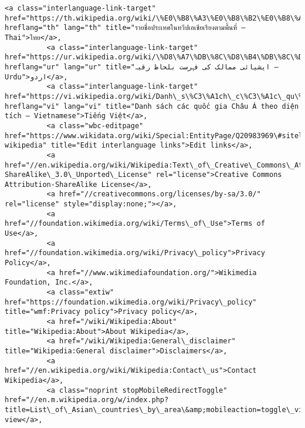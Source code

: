 \documentclass[11pt]{article}
\begin{document}
\begin{Verbatim}[commandchars=\\\{\}]
          <a class="interlanguage-link-target" href="https://th.wikipedia.org/wiki/\%E0\%B8\%A3\%E0\%B8\%B2\%E0\%B8\%A2\%E0\%B8\%8A\%E0\%B8\%B7\%E0\%B9\%88\%E0\%B8\%AD\%E0\%B8\%9B\%E0\%B8\%A3\%E0\%B8\%B0\%E0\%B9\%80\%E0\%B8\%97\%E0\%B8\%A8\%E0\%B9\%83\%E0\%B8\%99\%E0\%B8\%97\%E0\%B8\%A7\%E0\%B8\%B5\%E0\%B8\%9B\%E0\%B9\%80\%E0\%B8\%AD\%E0\%B9\%80\%E0\%B8\%8A\%E0\%B8\%B5\%E0\%B8\%A2\%E0\%B9\%80\%E0\%B8\%A3\%E0\%B8\%B5\%E0\%B8\%A2\%E0\%B8\%87\%E0\%B8\%95\%E0\%B8\%B2\%E0\%B8\%A1\%E0\%B8\%9E\%E0\%B8\%B7\%E0\%B9\%89\%E0\%B8\%99\%E0\%B8\%97\%E0\%B8\%B5\%E0\%B9\%88" hreflang="th" lang="th" title="รายชื่อประเทศในทวีปเอเชียเรียงตามพื้นที่ – Thai">ไทย</a>,
          <a class="interlanguage-link-target" href="https://ur.wikipedia.org/wiki/\%D8\%A7\%DB\%8C\%D8\%B4\%DB\%8C\%D8\%A7\%D8\%A6\%DB\%8C\_\%D9\%85\%D9\%85\%D8\%A7\%D9\%84\%DA\%A9\_\%DA\%A9\%DB\%8C\_\%D9\%81\%DB\%81\%D8\%B1\%D8\%B3\%D8\%AA\_\%D8\%A8\%D9\%84\%D8\%AD\%D8\%A7\%D8\%B8\_\%D8\%B1\%D9\%82\%D8\%A8\%DB\%81" hreflang="ur" lang="ur" title="ایشیائی ممالک کی فہرست بلحاظ رقبہ – Urdu">اردو</a>,
          <a class="interlanguage-link-target" href="https://vi.wikipedia.org/wiki/Danh\_s\%C3\%A1ch\_c\%C3\%A1c\_qu\%E1\%BB\%91c\_gia\_Ch\%C3\%A2u\_\%C3\%81\_theo\_di\%E1\%BB\%87n\_t\%C3\%ADch" hreflang="vi" lang="vi" title="Danh sách các quốc gia Châu Á theo diện tích – Vietnamese">Tiếng Việt</a>,
          <a class="wbc-editpage" href="https://www.wikidata.org/wiki/Special:EntityPage/Q20983969\#sitelinks-wikipedia" title="Edit interlanguage links">Edit links</a>,
          <a href="//en.wikipedia.org/wiki/Wikipedia:Text\_of\_Creative\_Commons\_Attribution-ShareAlike\_3.0\_Unported\_License" rel="license">Creative Commons Attribution-ShareAlike License</a>,
          <a href="//creativecommons.org/licenses/by-sa/3.0/" rel="license" style="display:none;"></a>,
          <a href="//foundation.wikimedia.org/wiki/Terms\_of\_Use">Terms of Use</a>,
          <a href="//foundation.wikimedia.org/wiki/Privacy\_policy">Privacy Policy</a>,
          <a href="//www.wikimediafoundation.org/">Wikimedia Foundation, Inc.</a>,
          <a class="extiw" href="https://foundation.wikimedia.org/wiki/Privacy\_policy" title="wmf:Privacy policy">Privacy policy</a>,
          <a href="/wiki/Wikipedia:About" title="Wikipedia:About">About Wikipedia</a>,
          <a href="/wiki/Wikipedia:General\_disclaimer" title="Wikipedia:General disclaimer">Disclaimers</a>,
          <a href="//en.wikipedia.org/wiki/Wikipedia:Contact\_us">Contact Wikipedia</a>,
          <a class="noprint stopMobileRedirectToggle" href="//en.m.wikipedia.org/w/index.php?title=List\_of\_Asian\_countries\_by\_area\&amp;mobileaction=toggle\_view\_mobile">Mobile view</a>,

\end{Verbatim}
\end{document}
